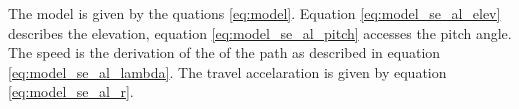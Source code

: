 The model is given by the quations \eqref{eq:model}. Equation \eqref{eq:model_se_al_elev} describes the elevation, equation \eqref{eq:model_se_al_pitch} accesses the pitch angle. The speed is the derivation of the of the path as described in equation \eqref{eq:model_se_al_lambda}. The travel accelaration is given by equation \eqref{eq:model_se_al_r}.  

